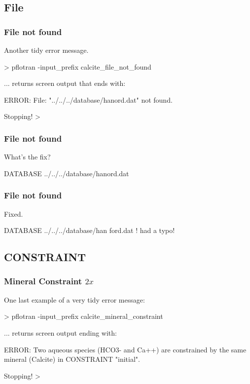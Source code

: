 \documentclass[aspectratio=169]{beamer}
\newcommand\gehcomment[1]{{{\color{orange} #1}}}
\newcommand\redcomment[1]{{{\color{red} #1}}}
\newcommand\bluecomment[1]{{{\color{blue} #1}}}
\newcommand\magentacomment[1]{{{\color{magenta} #1}}}
\begin{document}
\subsection{File}
\begin{frame}\frametitle{File not found}
Another tidy error message.
\begin{semiverbatim}

> pflotran -input_prefix calcite_file_not_found

... \gehcomment{returns screen output that ends with:}

  ERROR: File: "../../../database/hanord.dat" not found.

  Stopping!
>
\end{semiverbatim}

\end{frame}

\begin{frame}\frametitle{File not found}
\redcomment{What's the fix?}
\begin{semiverbatim}
DATABASE ../../../database/hanord.dat
\end{semiverbatim}

\end{frame}

\begin{frame}\frametitle{File not found}
\redcomment{Fixed.}
\begin{semiverbatim}
DATABASE ../../../database/han\magentacomment{f}ord.dat \bluecomment{! had a typo!}
\end{semiverbatim}

\end{frame}

\subsection{CONSTRAINT}

\begin{frame}\frametitle{Mineral Constraint ${2x}$}
One last example of a very tidy error message:
\begin{semiverbatim}

> pflotran -input_prefix calcite_mineral_constraint

... \gehcomment{returns screen output ending with:}

  ERROR: Two aqueous species (HCO3- and Ca++) are constrained by the
  same mineral (Calcite) in CONSTRAINT "initial".

  Stopping!
>
\end{semiverbatim}

\end{frame}
\end{document}
